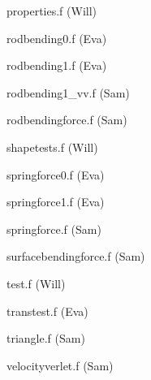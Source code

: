 \begin{description}
\begin{description}
  \item properties.f (Will)
  \item rodbending0.f (Eva)
  \item rodbending1.f (Eva)
  \item rodbending1\_vv.f (Sam)
  \item rodbendingforce.f (Sam)
  \item shapetests.f (Will)
  \item springforce0.f (Eva)
  \item springforce1.f (Eva)
  \item springforce.f (Sam)
  \item surfacebendingforce.f (Sam)
  \item test.f (Will)
  \item transtest.f (Eva)
  \item triangle.f (Sam)
  \item velocityverlet.f (Sam)
  \end{description}
\end{description}